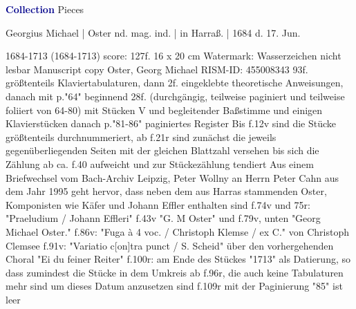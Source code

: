 \documentclass[twocolumn]{book}
\begin{document}
\newline \par \vspace{7pt} \textcolor{darkblue}{\textbf{Collection}}
 Pieces    
\newline \begin{itshape} Georgius Michael | Oster nd. mag. ind. | in Harraß. | 1684 d. 17. Jun.\end{itshape} 
\newline \textcolor{darkblue}{}  1684-1713 (1684-1713)  score: 127f.  16 x 20 cm
\newline Watermark: Wasserzeichen nicht lesbar
\newline Manuscript copy
\newline Oster, Georg Michael
\newline RISM-ID: 455008343
\newline 93f. größtenteils Klaviertabulaturen, dann 2f. eingeklebte theoretische Anweisungen, danach mit p."64" beginnend 28f. (durchgängig, teilweise paginiert und teilweise foliiert von 64-80) mit Stücken V und begleitender Baßstimme und einigen Klavierstücken danach p."81-86" paginiertes Register
\newline Bis f.12v sind die Stücke größtenteils durchnummeriert, ab f.21r sind zunächst die jeweils gegenüberliegenden Seiten mit der gleichen Blattzahl versehen bis sich die Zählung ab ca. f.40 aufweicht und zur Stückezählung tendiert
\newline Aus einem Briefwechsel vom Bach-Archiv Leipzig, Peter Wollny an Herrn Peter Cahn aus dem Jahr 1995 geht hervor, dass neben dem aus Harras stammenden Oster, Komponisten wie Käfer und Johann Effler enthalten sind
\newline f.74v und 75r: "Praeludium / Johann Effleri"
\newline f.43v "G. M Oster" und f.79v, unten "Georg Michael Oster."
\newline f.86v: "Fuga à 4 voc. / Christoph Klemse / ex C." von Christoph Clemsee
\newline f.91v: "Variatio c[on]tra punct / S. Scheid" über den vorhergehenden Choral "Ei du feiner Reiter"
\newline f.100r: am Ende des Stückes "1713" als Datierung, so dass zumindest die Stücke in dem Umkreis ab f.96r, die auch keine Tabulaturen mehr sind um dieses Datum anzusetzen sind
\newline f.109r mit der Paginierung "85" ist leer
\end{document}
